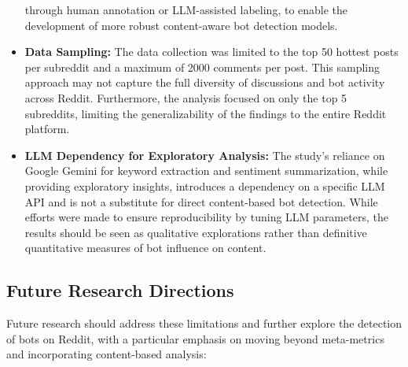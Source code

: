\documentclass[
  12pt,
  letterpaper,
  DIV=11,
  numbers=noendperiod]{scrartcl}
\begin{document}
\begin{itemize}
  through human annotation or LLM-assisted labeling, to enable the
  development of more robust content-aware bot detection models.
\item
  \textbf{Data Sampling:} The data collection was limited to the top 50
  hottest posts per subreddit and a maximum of 2000 comments per post.
  This sampling approach may not capture the full diversity of
  discussions and bot activity across Reddit. Furthermore, the analysis
  focused on only the top 5 subreddits, limiting the generalizability of
  the findings to the entire Reddit platform.
\item
  \textbf{LLM Dependency for Exploratory Analysis:} The study's reliance
  on Google Gemini for keyword extraction and sentiment summarization,
  while providing exploratory insights, introduces a dependency on a
  specific LLM API and is not a substitute for direct content-based bot
  detection. While efforts were made to ensure reproducibility by tuning
  LLM parameters, the results should be seen as qualitative explorations
  rather than definitive quantitative measures of bot influence on
  content.
\end{itemize}

\subsection{Future Research
Directions}\label{future-research-directions}

Future research should address these limitations and further explore the
detection of bots on Reddit, with a particular emphasis on moving beyond
meta-metrics and incorporating content-based analysis:
\end{document}
